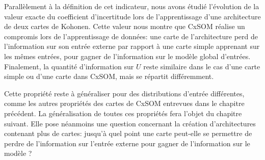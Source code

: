 \documentclass[../main]{subfiles}
\begin{document}
Parallèlement à la définition de cet indicateur, nous avons étudié l'évolution de la valeur exacte du coefficient d'incertitude lors de l'apprentissage d'une architecture de deux cartes de Kohonen. Cette valeur nous montre que CxSOM réalise un compromis lors de l'apprentissage de données: une carte de l'architecture perd de l'information sur son entrée externe par rapport à une carte simple apprenant sur les mêmes entrées, pour gagner de l'information sur le modèle global d'entrées. Finalement, la quantité d'information sur $U$ reste similaire dans le cas d'une carte simple ou d'une carte dans CxSOM, mais se répartit différemment.


Cette propriété reste à généraliser pour des distributions d'entrée différentes, comme les autres propriétés des cartes de CxSOM entrevues dans le chapitre précédent. La généralisation de toutes ces propriétés fera l'objet du chapitre suivant.
Elle pose néanmoins une question concernant la création d'architectures contenant plus de cartes: jusqu'à quel point une carte peut-elle se permettre de perdre de l'information sur l'entrée externe pour gagner de l'information sur le modèle ? 

\ifSubfilesClassLoaded{
    \printbibliography
}{}
\end{document}
